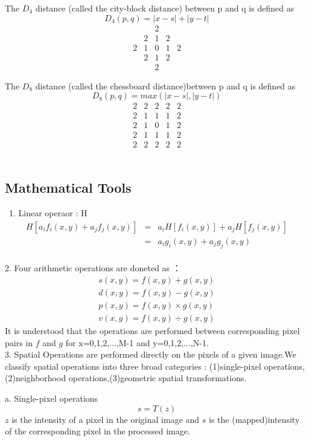 \documentclass[12pt]{article}
\begin{document}
The $D_4$ distance (called the city-block distance) between p and q is defined as \[D_4(p,q)=|x-s|+|y-t| \]
\[
\begin{array}{ccccc}
\  & \  &2 &\  &\ \\
\  &2 &1 &2 &\ \\
2 &1 &0 &1 &2\\
\  &2 &1 &2 &\ \\
\  & \  &2 &\  &\ 
\end{array}
\]

The $D_8$ distance (called the chessboard distance)between p and q is defined as \[D_8(p,q)=max(|x-s|,|y-t|)\]
\[
\begin{array}{ccccc}
2 &2 &2 &2 &2\\
2 &1 &1 &1 &2\\
2 &1 &0 &1 &2\\
2 &1 &1 &1 &2\\
2 &2 &2 &2 &2
\end{array}
\]
\\
\subsection{Mathematical Tools}\
1. Linear operaor : H
\begin{eqnarray*}
H[a_if_i(x,y)+a_jf_j(x,y)] &=& a_iH[f_i(x,y)]+a_jH[f_j(x,y)]\\
                           &=& a_ig_i(x,y)+a_jg_j(x,y)
\end{eqnarray*}
\\
2. Four arithmetic operations are doneted as ：
\begin{eqnarray*}
s(x,y)=f(x,y)+g(x,y)\\
d(x,y)=f(x,y)-g(x,y)\\
p(x,y)=f(x,y)\times g(x,y)\\
v(x,y)=f(x,y)\div g(x,y)
\end{eqnarray*}
It is understood that the operations are performed between corresponding pixel pairs in $f$ and $g$ for x=0,1,2,...,M-1 and y=0,1,2,...,N-1.
\\
3. Spatial Operations are performed directly on the pixels of a given image.We classify spatial operations into three broad categories : (1)single-pixel operations,(2)neighborhood operations,(3)geometric spatial transformations.

a. Single-pixel operations
\[
s=T(z)
\]
$z$ is the intensity of a pixel in the original image and $s$ is the (mapped)intensity of the corresponding pixel in the processed image. 
\end{document}
